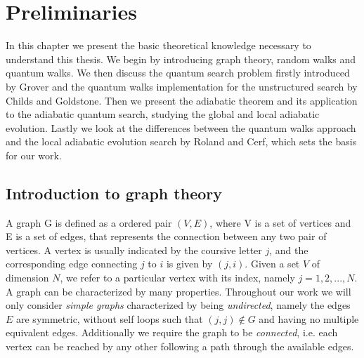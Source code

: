 \newcommand{\wvec}{\begin{pmatrix}1 \\ 0 \end{pmatrix}}
\newcommand{\svec}{{\begin{pmatrix}0 \\ 1 \end{pmatrix}}}
\newcommand{\kalpha}{\ket{\alpha}}
\newcommand{\kbeta}{\ket{\beta}}
\newcommand{\kpsi}{\ket{\psi}}




\newpage
\thispagestyle{empty}
\chapter{Preliminaries}\label{chapter one}
In this chapter we present the basic theoretical knowledge necessary to understand this thesis. We begin by introducing graph theory, random walks and quantum walks. We then discuss the quantum search problem firstly introduced by Grover and the quantum walks implementation for the unstructured search by Childs and Goldstone. Then we present the adiabatic theorem and its application to the adiabatic quantum search, studying the global and local adiabatic evolution. Lastly we look at the differences between the quantum walks approach and the local adiabatic evolution search by Roland and Cerf, which sets the basis for our work.

\section{Introduction to graph theory}\label{sec:introduction to graph theory}
A graph G is defined as a ordered pair $(V,E)$, where V is a set of vertices and E is a set of edges, that represents the connection between any two pair of vertices. A vertex is usually indicated by the coursive letter $j$, and the corresponding edge connecting $j$ to $i$ is given by $(j,i)$. Given a set $V$ of dimension $N$, we refer to a particular vertex with its index, namely $j=1,2,...,N$.\\

\noindent
A graph can be characterized by many properties. Throughout our work we will only consider \textit{simple graphs} characterized by being \textit{undirected}, namely the edges $E$ are symmetric, without self loops such that $(j,j)\notin G$ and having no multiple equivalent edges. Additionally we require the graph to be \textit{connected}, i.e. each vertex can be reached by any other following a path through the available edges.

